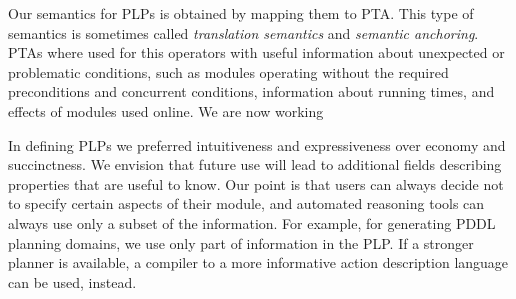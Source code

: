 \documentclass[letterpaper]{article}
\begin{document}
{Our semantics for PLPs is obtained by mapping them to PTA. This type of semantics is sometimes called {\em translation semantics\/} and {\em semantic anchoring}. 
PTAs where used for this operators with useful information about unexpected or problematic conditions, such as modules operating without the required preconditions and concurrent conditions, information about running times, and effects of modules used online. We are now working 

In defining PLPs we preferred intuitiveness and expressiveness over economy and succinctness. We envision that future use will lead to additional fields describing properties that are useful to know.
Our point is that users can always decide not to specify certain aspects of their module, and automated reasoning tools can always use only a subset of the information. For example, for generating PDDL planning domains, we use only part of information in the PLP. If a stronger planner is available, a compiler to a more informative action description language can be used, instead.
}


\end{document}
